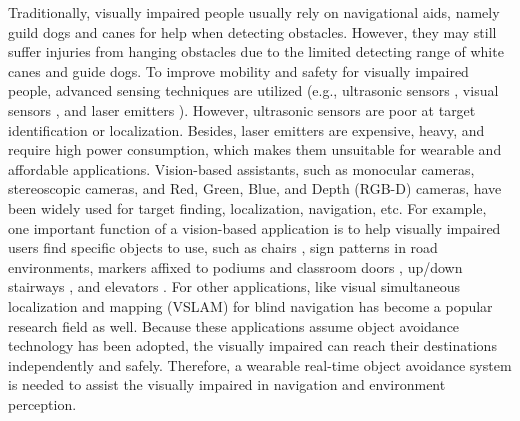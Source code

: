 \documentclass{ieeeaccess}
\begin{document}
Traditionally, visually impaired people usually rely on navigational aids, namely guild dogs \cite{IEEEexample:BhatlawandeDesign} and canes \cite{IEEEexample:7879309} for help when detecting obstacles. However, they may still suffer injuries from hanging obstacles due to the limited detecting range of white canes and guide dogs. To improve mobility and safety for visually impaired people, advanced sensing techniques are utilized (e.g., ultrasonic sensors \cite{IEEEexample:shoval1998navbelt} \cite{IEEEexample:shaikh2018wearable}, visual sensors \cite{IEEEexample:brock2013supporting} \cite{IEEEexample:huang2015indoor}, and laser emitters \cite{IEEEexample:kulyukin2006robot}). However, ultrasonic sensors are poor at target identification or localization. Besides, laser emitters are expensive, heavy, and require high power consumption, which makes them unsuitable for wearable and affordable applications. Vision-based assistants, such as monocular cameras, stereoscopic cameras, and Red, Green, Blue, and Depth (RGB-D) cameras, have been widely used for target finding, localization, navigation, etc. For example, one important function of a vision-based application is to help visually impaired users find specific objects to use, such as chairs \cite{IEEEexample:takizawa2019kinect}, sign patterns in road environments, markers affixed to podiums and classroom doors \cite{IEEEexample:huang2019augmented}, up/down stairways \cite{IEEEexample:westfechtel20163d} \cite{IEEEexample:perez2014detection} \cite{IEEEexample:westfechtel2018robust} \cite{IEEEexample:souto2017stairs}, and elevators \cite{IEEEexample:kuramochi2014recognition}. For other applications, like visual simultaneous localization and mapping (VSLAM) for blind navigation has become a popular research field \cite{IEEEexample:murata2018smartphone} \cite{IEEEexample:bai2018virtual} \cite{IEEEexample:kacorri2018environmental} \cite{IEEEexample:liu2018augmented} as well. Because these applications assume object avoidance technology has been adopted, the visually impaired can reach their destinations independently and safely. Therefore, a wearable real-time object avoidance system is needed to assist the visually impaired in navigation and environment perception.
\end{document}
